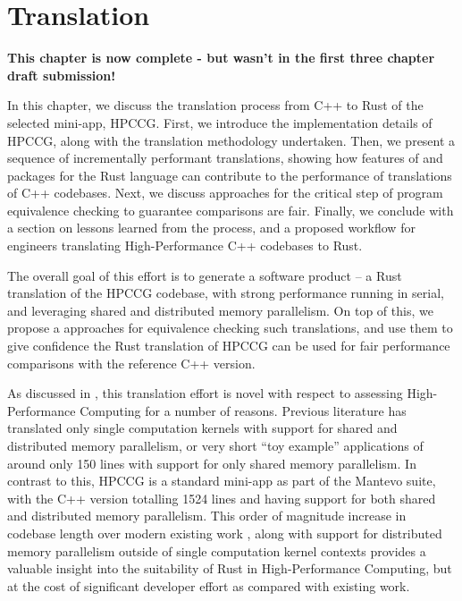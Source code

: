 \chapter{Translation}
\label{ch:translation} %

\textbf{This chapter is now complete - but wasn't in the first three chapter draft submission!}

In this chapter, we discuss the translation process from C++ to Rust of the selected mini-app, HPCCG. First, we introduce the implementation details of HPCCG, along with the translation methodology undertaken. Then, we present a sequence of incrementally performant translations, showing how features of and packages for the Rust language can contribute to the performance of translations of C++ codebases. Next, we discuss approaches for the critical step of program equivalence checking to guarantee comparisons are fair. Finally, we conclude with a section on lessons learned from the process, and a proposed workflow for engineers translating High-Performance C++ codebases to Rust.

The overall goal of this effort is to generate a software product -- a Rust translation of the HPCCG codebase, with strong performance running in serial, and leveraging shared and distributed memory parallelism. On top of this, we propose a approaches for equivalence checking such translations, and use them to give confidence the Rust translation of HPCCG can be used for fair performance comparisons with the reference C++ version.

As discussed in , this translation effort is novel with respect to assessing High-Performance Computing for a number of reasons. Previous literature has translated only single computation kernels \cite{} with support for shared and distributed memory parallelism, or very short ``toy example'' applications of around only 150 lines \cite{} \cite{} with support for only shared memory parallelism. In contrast to this, HPCCG is a standard mini-app as part of the Mantevo suite, with the C++ version totalling 1524 lines and having support for both shared and distributed memory parallelism. This order of magnitude increase in codebase length over modern existing work \cite{moranEmergingTechnologiesRust2023} \cite{costanzoPerformanceVsProgramming2021}, along with support for distributed memory parallelism outside of single computation kernel contexts provides a valuable insight into the suitability of Rust in High-Performance Computing, but at the cost of significant developer effort as compared with existing work.

